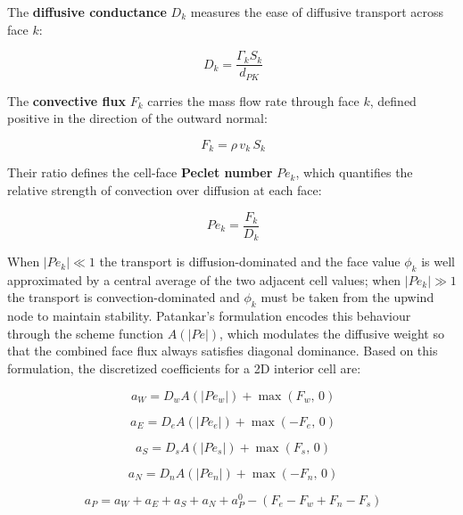 The \textbf{diffusive conductance} $D_k$ measures the ease of diffusive transport across face $k$:

\begin{equation}~\label{eqDiffConductance}
    D_k = \frac{\Gamma_k S_k}{d_{PK}}
\end{equation}

The \textbf{convective flux} $F_k$ carries the mass flow rate through face $k$, defined positive in the direction of the outward normal:

\begin{equation}~\label{eqConvFlux}
    F_k = \rho\, v_k\, S_k
\end{equation}

Their ratio defines the cell-face \textbf{Peclet number} $Pe_k$, which quantifies the relative strength of convection over diffusion at each face:

\begin{equation}~\label{eqPeclet}
    Pe_k = \frac{F_k}{D_k}
\end{equation}

When $|Pe_k| \ll 1$ the transport is diffusion-dominated and the face value $\phi_k$ is well approximated by a central average of the two adjacent cell values; when $|Pe_k| \gg 1$ the transport is convection-dominated and $\phi_k$ must be taken from the upwind node to maintain stability. Patankar's formulation encodes this behaviour through the scheme function $A(|Pe|)$, which modulates the diffusive weight so that the combined face flux always satisfies diagonal dominance. Based on this formulation, the discretized coefficients for a 2D interior cell are:

\begin{equation}~\label{eqConv_aw}
    a_W = D_w A(|Pe_w|) + \max(F_w,\, 0)
\end{equation}

\begin{equation}~\label{eqConv_ae}
    a_E = D_e A(|Pe_e|) + \max(-F_e,\, 0)
\end{equation}

\begin{equation}~\label{eqConv_as}
    a_S = D_s A(|Pe_s|) + \max(F_s,\, 0)
\end{equation}

\begin{equation}~\label{eqConv_an}
    a_N = D_n A(|Pe_n|) + \max(-F_n,\, 0)
\end{equation}

\begin{equation}~\label{eqConv_ap}
    a_P = a_W + a_E + a_S + a_N + a^0_P - (F_e - F_w + F_n - F_s)
\end{equation}


